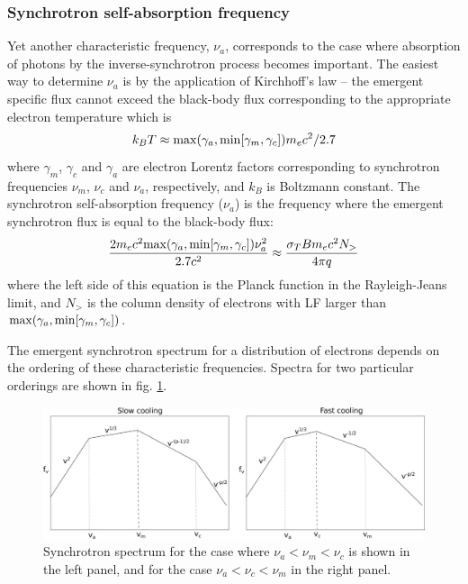 \documentclass[12pt,a4paper]{article}
\begin{document}
\subsubsection{Synchrotron self-absorption frequency}
Yet another characteristic frequency, $\nu_a$, corresponds to the case where absorption of photons by the inverse-synchrotron process becomes important. The easiest way to determine $\nu_a$ is by the application of Kirchhoff's law -- the emergent specific flux cannot 
exceed the black-body flux corresponding to the appropriate electron temperature which is
\begin{equation}
 k_B T \approx {\rm max} (\gamma_a, {\rm min}[\gamma_m,\gamma_c]) m_e c^2/2.7
\end{equation}
where $\gamma_m$, $\gamma_c$ and $\gamma_a$ are electron Lorentz factors
corresponding to synchrotron frequencies $\nu_m$, $\nu_c$ and $\nu_a$,
respectively, and $k_B$ is Boltzmann constant. The synchrotron self-absorption 
frequency ($\nu_a$) is the frequency where the emergent synchrotron flux 
is equal to the black-body flux:
\begin{equation}
   {2 m_e c^2 {\rm max}(\gamma_a,{\rm min}[\gamma_m,\gamma_c]) 
\nu_a^2 \over 2.7 c^2} \approx
         {\sigma_T B m_e c^2 N_>\over 4\pi q}
\label{nu_a}
\end{equation}
where the left side of this equation is the Planck function in the Rayleigh-Jeans limit, and $N_>$ is the column density of electrons with LF larger than ${\rm max}(\gamma_a,{\rm min} [\gamma_m,\gamma_c])$.

The emergent synchrotron spectrum for a distribution of electrons depends on the ordering of these characteristic frequencies. Spectra for two particular orderings are shown in fig. \ref{FIG:synchro_spectrum2}.

\begin{figure}
\begin{center}
\includegraphics[width=16cm]{synchro_spec2.jpg}
\caption{Synchrotron spectrum for the case where $\nu_a<\nu_m<\nu_c$ is shown in the left panel, and for the case $\nu_a<\nu_c<\nu_m$ in the right panel.
}
\label{FIG:synchro_spectrum2}
\end{center}
\end{figure}
\end{document}
